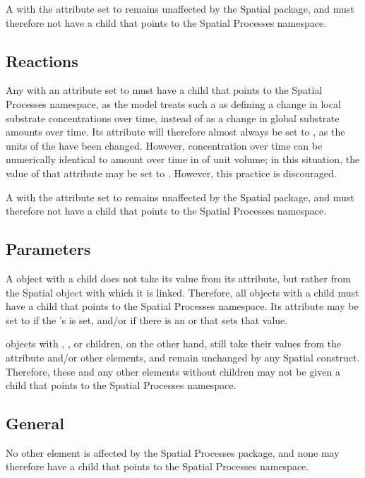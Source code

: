 A \Species with the  attribute set to  remains unaffected by the Spatial package, and must therefore not have a \ChangedMath child that points to the Spatial Processes namespace.

\subsection{Reactions}
Any \Reaction with an  attribute set to  must have a \ChangedMath child that points to the Spatial Processes namespace, as the model treats such a \Reaction as defining a change in local substrate concentrations over time, instead of as a change in global substrate amounts over time.  Its  attribute will therefore almost always be set to , as the units of the \KineticLaw have been changed.  However, concentration over time can be numerically identical to amount over time in \Compartments of unit volume; in this situation, the value of that attribute may be set to .  However, this practice is discouraged.

A \Reaction with the  attribute set to  remains unaffected by the Spatial package, and must therefore not have a \ChangedMath child that points to the Spatial Processes namespace.

\subsection{Parameters}
A \Parameter object with a \SpatialSymbolReference child does not take its value from its  attribute, but rather from the Spatial object with which it is linked.  Therefore, all \Parameter objects with a \SpatialSymbolReference child must have a \ChangedMath child that points to the Spatial Processes namespace.  Its  attribute may be set to  if the \Parameter's  is set, and/or if there is an \InitialAssignment or \Rule that sets that value.

\Parameter objects with \DiffusionCoefficient, \AdvectionCoefficient, or \BoundaryCondition children, on the other hand, still take their values from the  attribute and/or other \sbmlthreecore elements, and remain unchanged by any Spatial construct.  Therefore, these and any other \Parameter elements without \SpatialSymbolReference children may not be given a \ChangedMath child that points to the Spatial Processes namespace.

\subsection{General}
No other \sbmlthreecore element is affected by the Spatial Processes package, and none may therefore have a \ChangedMath child that points to the Spatial Processes namespace.
